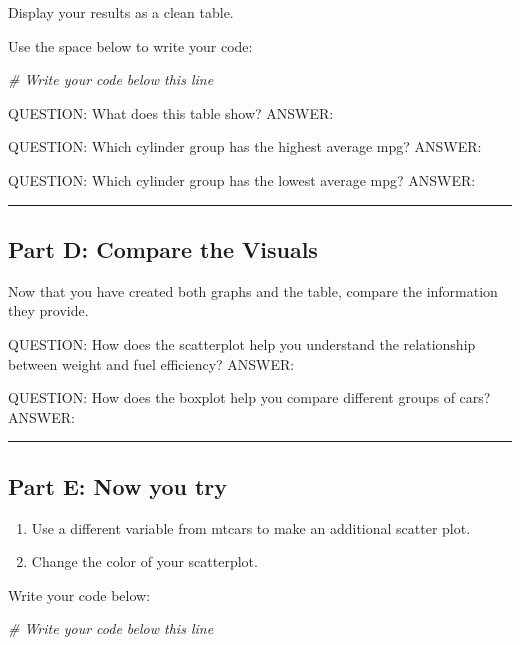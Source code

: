 \documentclass[
]{article}
\newenvironment{Shaded}{\begin{snugshade}}{\end{snugshade}}
\newcommand{\CommentTok}[1]{\textcolor[rgb]{0.56,0.35,0.01}{\textit{#1}}}
\providecommand{\tightlist}{%
  \setlength{\itemsep}{0pt}\setlength{\parskip}{0pt}}
\begin{document}
Display your results as a clean table.

Use the space below to write your code:

\begin{Shaded}
\begin{Highlighting}[]
\CommentTok{\# Write your code below this line}
\end{Highlighting}
\end{Shaded}

QUESTION: What does this table show? ANSWER:

QUESTION: Which cylinder group has the highest average mpg? ANSWER:

QUESTION: Which cylinder group has the lowest average mpg? ANSWER:

\begin{center}\rule{0.5\linewidth}{0.5pt}\end{center}

\subsection{Part D: Compare the
Visuals}\label{part-d-compare-the-visuals}

Now that you have created both graphs and the table, compare the
information they provide.

QUESTION: How does the scatterplot help you understand the relationship
between weight and fuel efficiency? ANSWER:

QUESTION: How does the boxplot help you compare different groups of
cars? ANSWER:

\begin{center}\rule{0.5\linewidth}{0.5pt}\end{center}

\subsection{Part E: Now you try}\label{part-e-now-you-try}

\begin{enumerate}
\def\labelenumi{\arabic{enumi}.}
\tightlist
\item
  Use a different variable from mtcars to make an additional scatter
  plot.
\item
  Change the color of your scatterplot.
\end{enumerate}

Write your code below:

\begin{Shaded}
\begin{Highlighting}[]
\CommentTok{\# Write your code below this line}
\end{Highlighting}
\end{Shaded}
\end{document}
